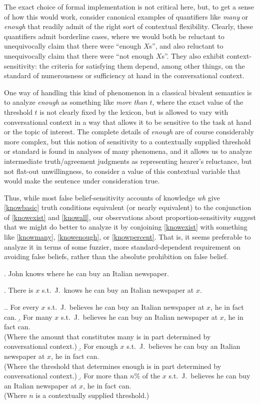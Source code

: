 \documentclass[a4paper]{article}
\begin{document}
The exact choice of formal implementation is not critical here, but, to get a sense of how this would work, consider canonical examples of quantifiers like \textit{many} or \textit{enough} that readily admit of the right sort of contextual flexibility. Clearly, these quantifiers admit borderline cases, where we would both be reluctant to unequivocally claim that there were ``enough $X$s'', and also reluctant to unequivocally claim that there were ``not enough $X$s''. They also exhibit context-sensitivity: the criteria for satisfying them depend, among other things, on the standard of numerousness or sufficiency at hand in the conversational context.

One way of handling this kind of phenomenon in a classical bivalent semantics is to analyze \textit{enough} as something like \textit{more than $t$}, where the exact value of the threshold $t$ is not clearly fixed by the lexicon, but is allowed to vary with conversational context in a way that allows it to be sensitive to the task at hand or the topic of interest. The complete details of \textit{enough} are of course considerably more complex, but this notion of sensitivity to a contextually supplied threshold or standard is found in analyses of many phenomena, and it allows us to analyze intermediate truth/agreement judgments as representing hearer's reluctance, but not flat-out unwillingness, to consider a value of this contextual variable that would make the sentence under consideration true.

Thus, while most false belief-sensitivity accounts of knowledge \textit{wh} give \ref{knowbasic} truth conditions equivalent (or nearly equivalent) to the conjunction of \ref{knowexist} and \ref{knowall}, our observations about proportion-sensitivity suggest that we might do better to analyze it by conjoining \ref{knowexist} with something like \ref{knowmany}, \ref{knowenough}, or \ref{knowpercent}. That is, it seems preferable to analyze it in terms of some fuzzier, more standard-dependent requirement on avoiding false beliefs, rather than the absolute prohibition on false belief.

\ex.\label{knowbasic} John knows where he can buy an Italian newspaper.

\ex.\label{knowexist} There is $x$ s.t.\ J.\ knows he can buy an Italian newspaper at $x$.

\ex.\label{variouscriteria}\a.\label{knowall} For every $x$ s.t.\ J.\ believes he can buy an Italian newspaper at $x$, he in fact can.
\b.\label{knowmany} For many $x$ s.t.\ J.\ believes he can buy an Italian newspaper at $x$, he in fact can.\\(Where the amount that constitutes many is in part determined by conversational context.)
\b.\label{knowenough} For enough $x$ s.t.\ J.\ believes he can buy an Italian newspaper at $x$, he in fact can.\\(Where the threshold that determines enough is in part determined by conversational context.)
\b.\label{knowpercent} For more than $n\%$ of the $x$ s.t.\ J.\ believes he can buy an Italian newspaper at $x$, he in fact can.\\(Where $n$ is a contextually supplied threshold.)
\end{document}
